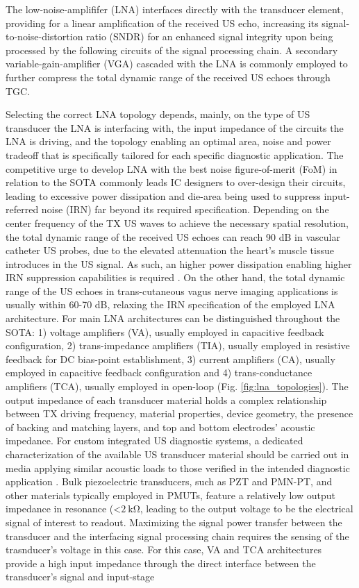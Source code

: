 The low-noise-amplififer (LNA) interfaces directly with the transducer element, providing for a linear amplification of the received US echo, increasing its signal-to-noise-distortion ratio (SNDR) for an enhanced signal integrity upon being processed by the following circuits of the signal processing chain. A secondary variable-gain-amplifier (VGA) cascaded with the LNA is commonly employed to further compress the total dynamic range of the received US echoes through TGC.  
\par
Selecting the correct LNA topology depends, mainly, on the type of US transducer the LNA is interfacing with, the input impedance of the circuits the LNA is driving, and the topology enabling an optimal area, noise and power tradeoff that is specifically tailored for each specific diagnostic application.  The competitive urge to develop LNA with the best noise figure-of-merit (FoM) in relation to the SOTA commonly leads IC designers to over-design their circuits, leading to excessive power dissipation and die-area being used to suppress input-referred noise (IRN) far beyond its required specification. Depending on the center frequency of the TX US waves to achieve the necessary spatial resolution, the total dynamic range of the received US echoes can reach 90 dB  in vascular catheter US probes, due to the elevated attenuation the heart's muscle tissue introduces in the US signal. As such, an higher power dissipation enabling higher IRN suppression capabilities is required \cite{ChaoChen2018,}. On the other hand, the total dynamic range of the US echoes in trans-cutaneous vagus nerve imaging applications is usually within 60-70 dB, relaxing the IRN specification of the employed LNA architecture.  For main LNA architectures can be distinguished throughout the SOTA: 1) voltage amplifiers (VA), usually employed in capacitive feedback configuration, 2) trans-impedance amplifiers (TIA), usually employed in resistive feedback for DC bias-point establishment, 3) current amplifiers (CA), usually employed in capacitive feedback configuration and 4) trans-conductance amplifiers (TCA), usually employed in open-loop (Fig. \ref{fig:lna_topologies}). The output impedance of each transducer material holds a complex relationship between TX driving frequency, material properties, device geometry, the presence of backing and matching layers, and top and bottom electrodes' acoustic impedance. For custom integrated US diagnostic systems, a dedicated characterization of the available US transducer material should be carried out in media applying similar acoustic loads to those verified in the intended diagnostic application \cite{ChaoChenReviewPaper, ChaoChen2018}. Bulk piezoelectric transducers, such as PZT and PMN-PT, and other materials typically employed in PMUTs, feature a relatively low output impedance in resonance (<$\mathrm{2 \ k\Omega}$, leading to the output voltage to be the electrical signal of interest to readout.  Maximizing the signal power transfer between the transducer and the interfacing signal processing chain requires the sensing of the trasnducer's voltage in this case. For this case, VA \cite{} and TCA \cite{} architectures provide a high input impedance through the direct interface between the transducer's signal and input-stage 